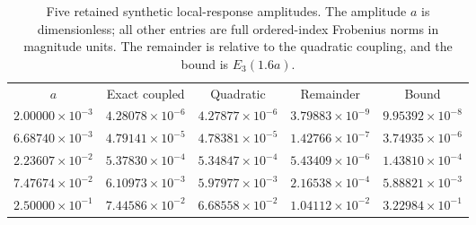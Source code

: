 \begin{table}[htb]
\caption{Five retained synthetic local-response amplitudes. The amplitude $a$ is dimensionless; all other entries are full ordered-index Frobenius norms in magnitude units. The remainder is relative to the quadratic coupling, and the bound is $E_3(1.6a)$.}\label{tab:optical}
\begin{ruledtabular}
\begin{tabular}{ccccc}
$a$ & Exact coupled & Quadratic & Remainder & Bound \\
$2.00000\times10^{-3}$ & $4.28078\times10^{-6}$ & $4.27877\times10^{-6}$ & $3.79883\times10^{-9}$ & $9.95392\times10^{-8}$ \\
$6.68740\times10^{-3}$ & $4.79141\times10^{-5}$ & $4.78381\times10^{-5}$ & $1.42766\times10^{-7}$ & $3.74935\times10^{-6}$ \\
$2.23607\times10^{-2}$ & $5.37830\times10^{-4}$ & $5.34847\times10^{-4}$ & $5.43409\times10^{-6}$ & $1.43810\times10^{-4}$ \\
$7.47674\times10^{-2}$ & $6.10973\times10^{-3}$ & $5.97977\times10^{-3}$ & $2.16538\times10^{-4}$ & $5.88821\times10^{-3}$ \\
$2.50000\times10^{-1}$ & $7.44586\times10^{-2}$ & $6.68558\times10^{-2}$ & $1.04112\times10^{-2}$ & $3.22984\times10^{-1}$ \\
\end{tabular}\end{ruledtabular}\end{table}
